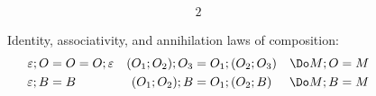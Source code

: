 \documentclass[runningheads]{llncs}
\begin{document}
\begin{figure}
\centering

\begin{alignat*}{2}
\end{alignat*}

Identity, associativity, and annihilation laws of composition:
\begin{align*}
  \varepsilon; O &= O = O; \varepsilon
  &
  (O_1; O_2); O_3 &= O_1; (O_2; O_3)
  &
  \Do M; O &= \do M
  \\
  \varepsilon; B &= B
  &
  (O_1; O_2); B &= O_1; (O_2; B)
  &
  \Do M; B &= \do M
\end{align*}




\end{figure}
\end{document}
